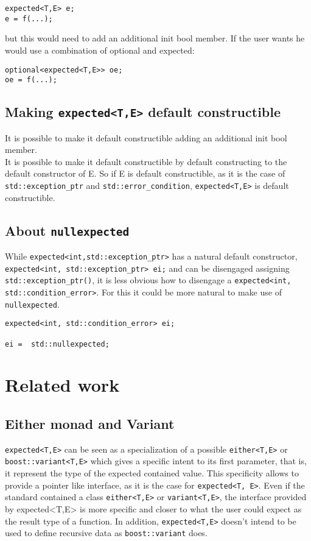 \documentclass[a4paper,10pt]{article}
\newcommand{\cpp}[1]{\lstinline{#1}}
\begin{document}
\begin{lstlisting}
expected<T,E> e;
e = f(...);
\end{lstlisting}

but this would need to add an additional init bool member. If the user wants he would use a combination of optional and expected:

\begin{lstlisting}
optional<expected<T,E>> oe;
oe = f(...);
\end{lstlisting}

\subsection{Making \cpp{expected<T,E>} default constructible}

It is possible to make it default constructible adding an additional init bool member. \\
It is possible to make it default constructible by default constructing to the default constructor of E. So if  E is default constructible, as it is the case of \cpp{std::exception_ptr} and \cpp{std::error_condition}, \cpp{expected<T,E>} is default constructible.

\subsection{About \cpp{nullexpected}}
While \cpp{expected<int,std::exception_ptr>} has a natural default constructor, \cpp{expected<int, std::exception_ptr> ei;}
and can be disengaged assigning \cpp{std::exception_ptr()}, it is less obvious how to disengage a \cpp{expected<int, std::condition_error>}. For this it could be more natural to make use of \cpp{nullexpected}.

\begin{lstlisting}
expected<int, std::condition_error> ei;

ei =  std::nullexpected;
\end{lstlisting}

\section{Related work}

\subsection{Either monad and Variant}

\cpp{expected<T,E>} can be seen as a specialization of a possible \cpp{either<T,E>} or \cpp{boost::variant<T,E>} which gives a specific intent to its first parameter, that is, it represent the type of the expected contained value. This specificity allows to provide a pointer like interface, as it is the case for \cpp{expected<T, E>}. Even if the standard contained a class \cpp{either<T,E>} or \cpp{variant<T,E>}, the interface provided by expected<T,E> is more specific and closer to what the user could expect as the result type of a function. In addition, \cpp{expected<T,E>} doesn't intend to be used to define recursive data as \cpp{boost::variant} does.
\end{document}
